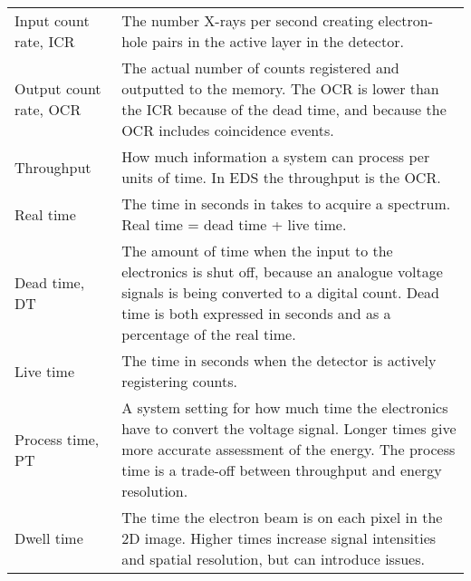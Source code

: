 \begin{table}[pht]
\begin{center}
\begin{tabular}{p{2.6cm}p{12cm}}
            Input count rate, ICR             & The number X-rays per second creating electron-hole pairs in the active layer in the detector.                                                                                                                             \\
            Output count rate, OCR            & The actual number of counts registered and outputted to the memory. The OCR is lower than the ICR because of the dead time, and because the OCR includes coincidence events.                                               \\
            Throughput                        & How much information a system can process per units of time. In EDS the throughput is the OCR.                                                                                                                             \\
            Real time                         & The time in seconds in takes to acquire a spectrum. Real time = dead time + live time.                                                                                                                                     \\
            Dead time, DT                     & The amount of time when the input to the electronics is shut off, because an analogue voltage signals is being converted to a digital count. Dead time is both expressed in seconds and as a percentage of the real time.  \\
            Live time                         & The time in seconds when the detector is actively registering counts.                                                                                                                                                      \\
            Process time, PT                  & A system setting for how much time the electronics have to convert the voltage signal. Longer times give more accurate assessment of the energy. The process time is a trade-off between throughput and energy resolution. \\
            Dwell time                        & The time the electron beam is on each pixel in the 2D image. Higher times increase signal intensities and spatial resolution, but can introduce issues.                                                                    \\
            \hline
        \end{tabular}
    \end{center}
\end{table}